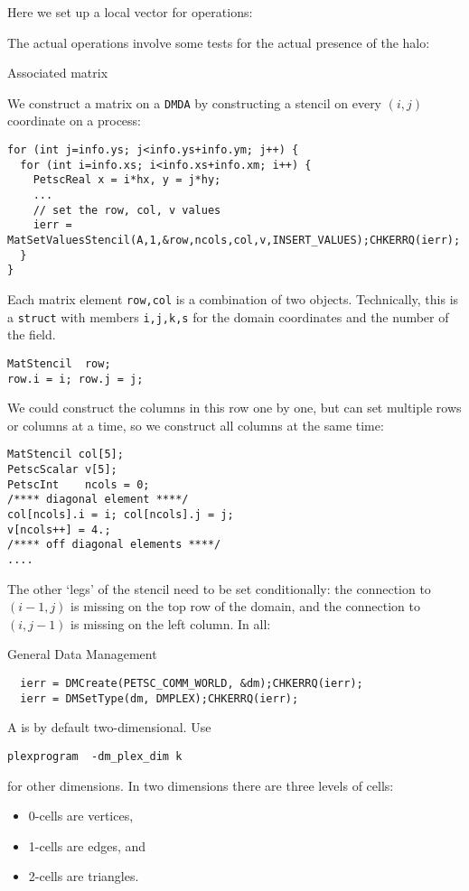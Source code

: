 Here we set up a local vector for operations:
%

The actual operations involve some tests for the actual presence of the halo:
%

 {Associated matrix}

We construct a matrix on a \lstinline{DMDA} by constructing a stencil
on every $(i,j)$ coordinate on a process:
\begin{lstlisting}
for (int j=info.ys; j<info.ys+info.ym; j++) {
  for (int i=info.xs; i<info.xs+info.xm; i++) {
    PetscReal x = i*hx, y = j*hy;
    ...
    // set the row, col, v values
    ierr = MatSetValuesStencil(A,1,&row,ncols,col,v,INSERT_VALUES);CHKERRQ(ierr);
  }
}
\end{lstlisting}

Each matrix element \lstinline{row,col}
is a combination of two  objects.
Technically, this is a \lstinline{struct} with members \lstinline{i,j,k,s}
for the domain coordinates and the number of the field.
\begin{lstlisting}
MatStencil  row;
row.i = i; row.j = j; 
\end{lstlisting}
We could construct the columns in this row one by one,
but  can set multiple rows or columns at a time,
so we construct all columns at the same time:
\begin{lstlisting}
MatStencil col[5];
PetscScalar v[5];
PetscInt    ncols = 0;
/**** diagonal element ****/
col[ncols].i = i; col[ncols].j = j;
v[ncols++] = 4.;
/**** off diagonal elements ****/
....
\end{lstlisting}

The other `legs' of the stencil need to be set conditionally:
the connection to $(i-1,j)$ is missing on the top row of the domain,
and the connection to $(i,j-1)$ is missing on the left column.
In all:
%


 {General Data Management}

\begin{lstlisting}
  ierr = DMCreate(PETSC_COMM_WORLD, &dm);CHKERRQ(ierr);
  ierr = DMSetType(dm, DMPLEX);CHKERRQ(ierr);
\end{lstlisting}

A  is by default two-dimensional.
Use
\begin{verbatim}
plexprogram  -dm_plex_dim k
\end{verbatim}
for other dimensions.
In two dimensions there are three levels of cells:
\begin{itemize}
\item
  0-cells are vertices,
\item 1-cells are edges, and
\item 2-cells are triangles.
\end{itemize}

